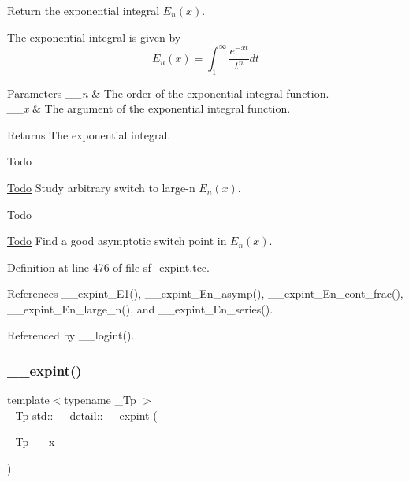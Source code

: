 Return the exponential integral $ E_n(x) $. 

The exponential integral is given by \[ E_n(x) = \int_{1}^\infty \frac{e^{-xt}}{t^n} dt \]


\begin{DoxyParams}{Parameters}
{\em \+\_\+\+\_\+n} & The order of the exponential integral function. \\
\hline
{\em \+\_\+\+\_\+x} & The argument of the exponential integral function. \\
\hline
\end{DoxyParams}
\begin{DoxyReturn}{Returns}
The exponential integral. 
\end{DoxyReturn}
\begin{DoxyRefDesc}{Todo}
\item[\hyperlink{todo__todo000011}{Todo}]Study arbitrary switch to large-\/n $ E_n(x) $. \end{DoxyRefDesc}


\begin{DoxyRefDesc}{Todo}
\item[\hyperlink{todo__todo000012}{Todo}]Find a good asymptotic switch point in $ E_n(x) $. \end{DoxyRefDesc}


Definition at line 476 of file sf\+\_\+expint.\+tcc.



References \+\_\+\+\_\+expint\+\_\+\+E1(), \+\_\+\+\_\+expint\+\_\+\+En\+\_\+asymp(), \+\_\+\+\_\+expint\+\_\+\+En\+\_\+cont\+\_\+frac(), \+\_\+\+\_\+expint\+\_\+\+En\+\_\+large\+\_\+n(), and \+\_\+\+\_\+expint\+\_\+\+En\+\_\+series().



Referenced by \+\_\+\+\_\+logint().

\mbox{\label{namespacestd_1_1____detail_abefd4102ce8a673604204e360074ceaa}} 
\subsubsection{\texorpdfstring{\+\_\+\+\_\+expint()}{\_\_expint()}\hspace{0.1cm}{\footnotesize\ttfamily [2/2]}}
{\footnotesize\ttfamily template$<$typename \+\_\+\+Tp $>$ \\
\+\_\+\+Tp std\+::\+\_\+\+\_\+detail\+::\+\_\+\+\_\+expint (\begin{DoxyParamCaption}\item[{\+\_\+\+Tp}]{\+\_\+\+\_\+x }\end{DoxyParamCaption})}



